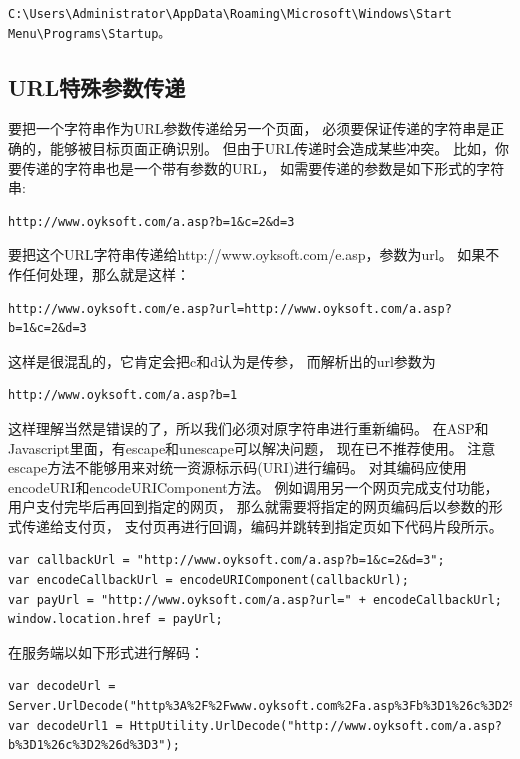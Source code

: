 \documentclass{book}
\begin{document}
\begin{lstlisting}
C:\Users\Administrator\AppData\Roaming\Microsoft\Windows\Start Menu\Programs\Startup。
\end{lstlisting}

\subsection{URL特殊参数传递}

要把一个字符串作为URL参数传递给另一个页面，
必须要保证传递的字符串是正确的，能够被目标页面正确识别。
但由于URL传递时会造成某些冲突。
比如，你要传递的字符串也是一个带有参数的URL，
如需要传递的参数是如下形式的字符串:

\begin{lstlisting}
http://www.oyksoft.com/a.asp?b=1&c=2&d=3
\end{lstlisting}

要把这个URL字符串传递给http://www.oyksoft.com/e.asp，参数为url。
如果不作任何处理，那么就是这样：

\begin{lstlisting}
http://www.oyksoft.com/e.asp?url=http://www.oyksoft.com/a.asp?b=1&c=2&d=3
\end{lstlisting}

这样是很混乱的，它肯定会把c和d认为是传参，
而解析出的url参数为

\begin{lstlisting}[language=HTML]
http://www.oyksoft.com/a.asp?b=1
\end{lstlisting}

这样理解当然是错误的了，所以我们必须对原字符串进行重新编码。
在ASP和Javascript里面，有escape和unescape可以解决问题，
现在已不推荐使用。
注意escape方法不能够用来对统一资源标示码(URI)进行编码。
对其编码应使用encodeURI和encodeURIComponent方法。
例如调用另一个网页完成支付功能，
用户支付完毕后再回到指定的网页，
那么就需要将指定的网页编码后以参数的形式传递给支付页，
支付页再进行回调，编码并跳转到指定页如下代码片段所示。

\begin{lstlisting}[language=VBScript]
var callbackUrl = "http://www.oyksoft.com/a.asp?b=1&c=2&d=3";
var encodeCallbackUrl = encodeURIComponent(callbackUrl);
var payUrl = "http://www.oyksoft.com/a.asp?url=" + encodeCallbackUrl;
window.location.href = payUrl;
\end{lstlisting}

在服务端以如下形式进行解码：

\begin{lstlisting}[language={[Sharp]C}]
var decodeUrl = Server.UrlDecode("http%3A%2F%2Fwww.oyksoft.com%2Fa.asp%3Fb%3D1%26c%3D2%26d%3D3");
var decodeUrl1 = HttpUtility.UrlDecode("http://www.oyksoft.com/a.asp?b%3D1%26c%3D2%26d%3D3");
\end{lstlisting}
\end{document}
